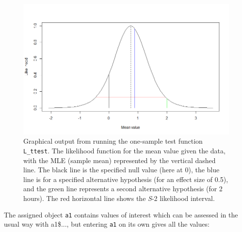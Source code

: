 \begin{figure}[htbp]
\centering
\includegraphics[width=12cm,
  keepaspectratio,]{figure1}
\caption{Graphical output from running the one-sample test function \texttt{L\_ttest}. The likelihood function for the mean value given the data, with the MLE (sample mean) represented by the vertical dashed line. The black line is the specified null value (here at 0), the blue line is for a specified alternative hypothesis (for an effect size of 0.5), and the green line represents a second alternative hypothesis (for 2 hours). The red horizontal line shows the \emph{S}-2 likelihood interval.}
\label{figure:figure1}
\end{figure}
The assigned object \texttt{a1} contains values of interest which can be assessed in the usual way with a1\$..., but entering \texttt{a1} on its own gives all the values:

